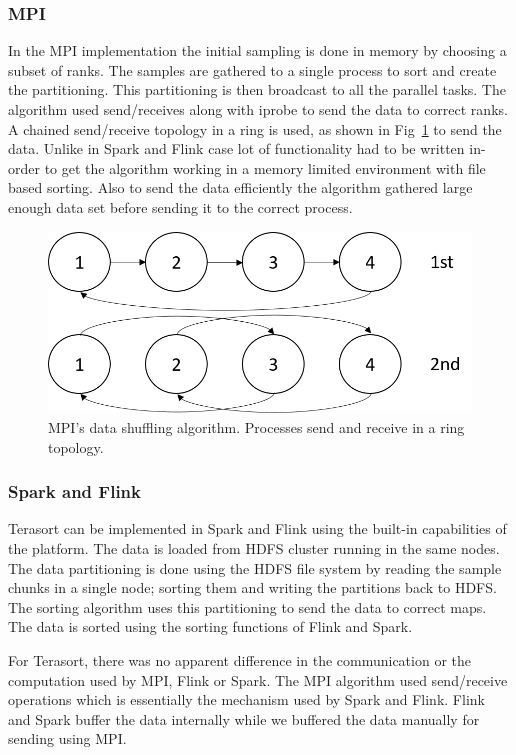 \documentclass[conference]{IEEEtran}
\begin{document}
\subsubsection{MPI}

In the MPI implementation the initial sampling is done in memory by choosing a subset of ranks. The samples are gathered to a single process to sort and create the partitioning. This partitioning is then broadcast to all the parallel tasks. The algorithm used send/receives along with iprobe to send the data to correct ranks. A chained send/receive topology in a ring is used, as shown in Fig~\ref{fig:fig_mpi_ring_send} to send the data. Unlike in Spark and Flink case lot of functionality had to be written in-order to get the algorithm working in a memory limited environment with file based sorting. Also to send the data efficiently the algorithm gathered large enough data set before sending it to the correct process. 

\begin{figure}
    \centering
    \includegraphics[width=0.55\columnwidth]{images/terasort_shuffle.png}
    \caption{MPI's data shuffling algorithm. Processes send and receive in a ring topology.}
    \label{fig:fig_mpi_ring_send}
\end{figure}


\subsubsection{Spark and Flink} 

Terasort can be implemented in Spark and Flink using the built-in capabilities of the platform. The data is loaded from HDFS cluster running in the same nodes. The data partitioning is done using the HDFS file system by reading the sample chunks in a single node; sorting them and writing the partitions back to HDFS. The sorting algorithm uses this partitioning to send the data to correct maps. The data is sorted using the sorting functions of Flink and Spark.

For Terasort, there was no apparent difference in the communication or the computation used by MPI, Flink or Spark. The MPI algorithm used send/receive operations which is essentially the mechanism used by Spark and Flink. Flink and Spark buffer the data internally while we buffered the data manually for sending using MPI.
\end{document}
